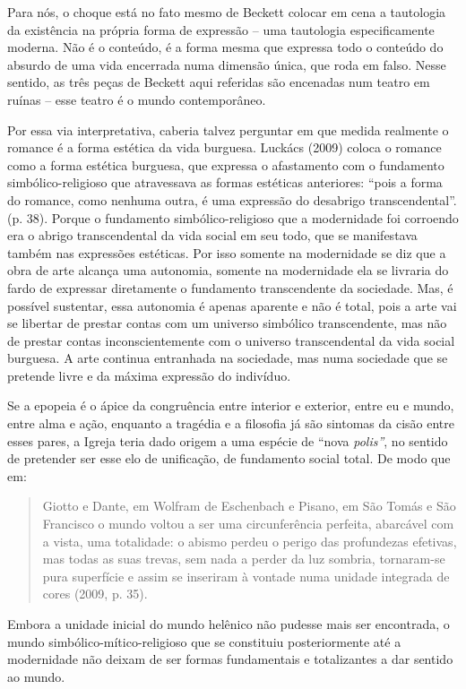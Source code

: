 Para nós, o choque está no fato mesmo de Beckett colocar em cena a
tautologia da existência na própria forma de expressão -- uma tautologia
especificamente moderna. Não é o conteúdo, é a forma mesma que expressa
todo o conteúdo do absurdo de uma vida encerrada numa dimensão única,
que roda em falso. Nesse sentido, as três peças de Beckett aqui
referidas são encenadas num teatro em ruínas -- esse teatro é o mundo
contemporâneo.

Por essa via interpretativa, caberia talvez perguntar em que medida
realmente o romance é a forma estética da vida burguesa. Luckács (2009)
coloca o romance como a forma estética burguesa, que expressa o
afastamento com o fundamento simbólico-religioso que atravessava as
formas estéticas anteriores: ``pois a forma do romance, como nenhuma
outra, é uma expressão do desabrigo transcendental''. (p. 38). Porque o
fundamento simbólico-religioso que a modernidade foi corroendo era o
abrigo transcendental da vida social em seu todo, que se manifestava
também nas expressões estéticas. Por isso somente na modernidade se diz
que a obra de arte alcança uma autonomia, somente na modernidade ela se
livraria do fardo de expressar diretamente o fundamento transcendente da
sociedade. Mas, é possível sustentar, essa autonomia é apenas aparente e
não é total, pois a arte vai se libertar de prestar contas com um
universo simbólico transcendente, mas não de prestar contas
inconscientemente com o universo transcendental da vida social burguesa.
A arte continua entranhada na sociedade, mas numa sociedade que se
pretende livre e da máxima expressão do indivíduo.

Se a epopeia é o ápice da congruência entre interior e exterior, entre
eu e mundo, entre alma e ação, enquanto a tragédia e a filosofia já são
sintomas da cisão entre esses pares, a Igreja teria dado origem a uma
espécie de ``nova \emph{polis''}, no sentido de pretender ser esse elo
de unificação, de fundamento social total. De modo que em:

\begin{quote}
Giotto e Dante, em Wolfram de Eschenbach e Pisano, em São Tomás e São
Francisco o mundo voltou a ser uma circunferência perfeita, abarcável
com a vista, uma totalidade: o abismo perdeu o perigo das profundezas
efetivas, mas todas as suas trevas, sem nada a perder da luz sombria,
tornaram-se pura superfície e assim se inseriram à vontade numa unidade
integrada de cores (2009, p. 35).
\end{quote}

Embora a unidade inicial do mundo helênico não pudesse mais ser
encontrada, o mundo simbólico-mítico-religioso que se constituiu
posteriormente até a modernidade não deixam de ser formas fundamentais e
totalizantes a dar sentido ao mundo.


